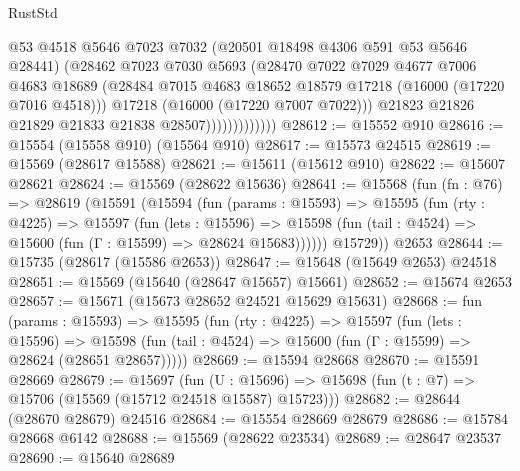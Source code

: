 \begin{lexlean}{RustStd}
\begin{coremodule}
                            @53
                            @4518
                            @5646
                            @7023
                            @7032
                            (@20501 @18498 @4306 @591 @53 @5646 @28441)
                            (@28462
                              @7023
                              @7030
                              @5693
                              (@28470
                                @7022
                                @7029
                                @4677
                                @7006
                                @4683
                                @18689
                                (@28484
                                  @7015
                                  @4683
                                  @18652
                                  @18579
                                  @17218
                                  (@16000 (@17220 @7016 @4518)))
                                @17218
                                (@16000 (@17220 @7007 @7022)))
                              @21823
                              @21826
                              @21829
                              @21833
                              @21838
                              @28507)))))))))))))
@28612 := @15552 @910
@28616 := @15554 (@15558 @910) (@15564 @910)
@28617 := @15573 @24515
@28619 := @15569 (@28617 @15588)
@28621 := @15611 (@15612 @910)
@28622 := @15607 @28621
@28624 := @15569 (@28622 @15636)
@28641 := @15568
    (fun (fn : @76) =>
    @28619
      (@15591
        (@15594
          (fun (params : @15593) =>
          @15595
            (fun (rty : @4225) =>
            @15597
              (fun (lets : @15596) =>
              @15598 (fun (tail : @4524) => @15600 (fun (Γ : @15599) => @28624 @15683))))))
        @15729))
    @2653
@28644 := @15735 (@28617 (@15586 @2653))
@28647 := @15648 (@15649 @2653) @24518
@28651 := @15569 (@15640 (@28647 @15657) @15661)
@28652 := @15674 @2653
@28657 := @15671 (@15673 @28652 @24521 @15629 @15631)
@28668 := fun (params : @15593) =>
  @15595
    (fun (rty : @4225) =>
    @15597
      (fun (lets : @15596) =>
      @15598 (fun (tail : @4524) => @15600 (fun (Γ : @15599) => @28624 (@28651 @28657)))))
@28669 := @15594 @28668
@28670 := @15591 @28669
@28679 := @15697
    (fun (U : @15696) => @15698 (fun (t : @7) => @15706 (@15569 (@15712 @24518 @15587) @15723)))
@28682 := @28644 (@28670 @28679) @24516
@28684 := @15554 @28669 @28679
@28686 := @15784 @28668 @6142
@28688 := @15569 (@28622 @23534)
@28689 := @28647 @23537
@28690 := @15640 @28689

\end{coremodule}
\end{lexlean}
